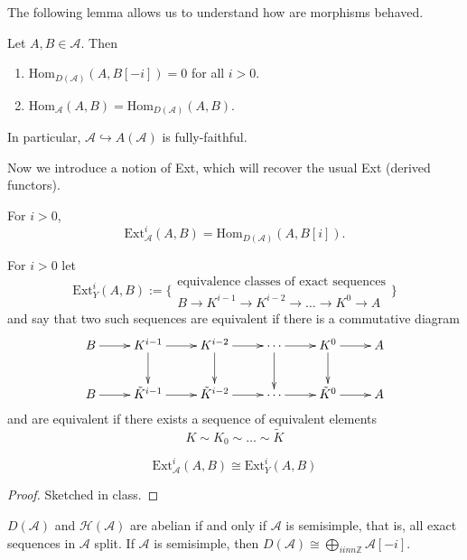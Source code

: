 \medskip
The following lemma allows us to understand how are morphisms behaved.

\begin{lemma}
\label{lemma-Homs}
Let $A,B \in \mathcal{A}$. Then
 \begin{enumerate}
\item $\text{Hom}_{D(\mathcal{A})}(A,B[-i])=0$ for all $i>0$.
\item $\text{Hom}_{\mathcal{A}}(A,B)=\text{Hom}_{D(\mathcal{A})}(A,B)$.
\end{enumerate}
In particular, $\mathcal{A} \hookrightarrow A(\mathcal{A})$ is fully-faithful.
\end{lemma}

Now we introduce a notion of Ext, which will recover the usual Ext (derived
functors).

\begin{definition}
\label{definition-Ext}
For $i>0$,
$$
\text{Ext}^i_{\mathcal{A}}(A,B)=\text{Hom}_{D(\mathcal{A})}(A,B[i]).
$$
\end{definition}

\begin{definition}[Yoneda]
\label{definition-Yoneda}
For $i>0$ let
$$
\text{Ext}_Y^i(A,B):=\{\substack{\text{equivalence classes of exact sequences}\\
B\to K^{i-1}\to K^{i-2}\to \ldots \to K^0 \to A}\}
$$
and say that two such sequences are equivalent if there is a commutative diagram
$$
\xymatrix{
B\ar[r]&  K^{i-1}\ar[r]\ar[d]&  K^{i-2}\ar[r]\ar[d]& \cdots\ar[r]\ar[d]
&K^0\ar[r]\ar[d]&A\\
B\ar[r]&  \tilde{K}^{i-1}\ar[r]&  \tilde{K}^{i-2}\ar[r]& \cdots\ar[r]
&\tilde{K}^0\ar[r]&A
}
$$
and are equivalent if there exists a sequence of equivalent elements
$$
K \sim K_0 \sim \ldots \sim \tilde{K}
$$
\end{definition}

\begin{proposition}
\label{proposition-Ext}
$$
\text{Ext}_{\mathcal{A}}^i(A,B) \cong \text{Ext}_Y^i(A,B)
$$
\end{proposition}

\begin{proof}
Sketched in class.
\end{proof}

\begin{exercise}
\label{exercise-derived-and-homotopy-categories-abelian-characterization}
$D(\mathcal{A})$ and  $\mathcal{H}(\mathcal{A})$ are abelian if and only if
$\mathcal{A}$ is semisimple, that is, all exact sequences in $\mathcal{A}$
split. If $\mathcal{A}$ is semisimple, then $D(\mathcal{A})\cong \bigoplus_{i
inn \mathbb{Z}}\mathcal{A}[-i]$.
\end{exercise}

